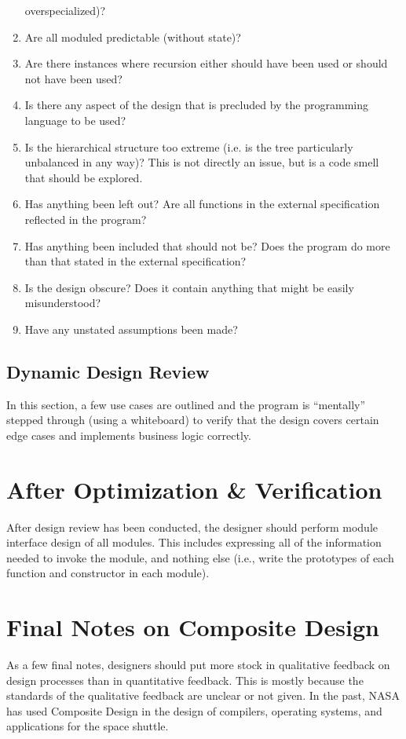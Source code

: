\documentclass[format.tex]{subfiles}
\begin{document}
\begin{enumerate}
  overspecialized)?
\item Are all moduled predictable (without state)?
\item Are there instances where recursion either should have been used or
  should not have been used?
\item Is there any aspect of the design that is precluded by the programming
  language to be used?
\item Is the hierarchical structure too extreme (i.e. is the tree particularly
  unbalanced in any way)? This is not directly an issue, but is a code smell
  that should be explored.
\item Has anything been left out? Are all functions in the external
  specification reflected in the program?
\item Has anything been included that should not be? Does the program do more
  than that stated in the external specification?
\item Is the design obscure? Does it contain anything that might be easily
  misunderstood?
\item Have any unstated assumptions been made?
\end{enumerate}

\subsection{Dynamic Design Review}
In this section, a few use cases are outlined and the program is ``mentally''
stepped through (using a whiteboard) to verify that the design covers certain
edge cases and implements business logic correctly.

\section{After Optimization \& Verification}
After design review has been conducted, the designer should perform module
interface design of all modules. This includes expressing all of the
information needed to invoke the module, and nothing else (i.e., write the
prototypes of each function and constructor in each module).

\section{Final Notes on Composite Design}
As a few final notes, designers should put more stock in qualitative feedback
on design processes than in quantitative feedback. This is mostly because the
standards of the qualitative feedback are unclear or not given. In the past,
NASA has used Composite Design in the design of compilers, operating systems,
and applications for the space shuttle.
\end{document}
